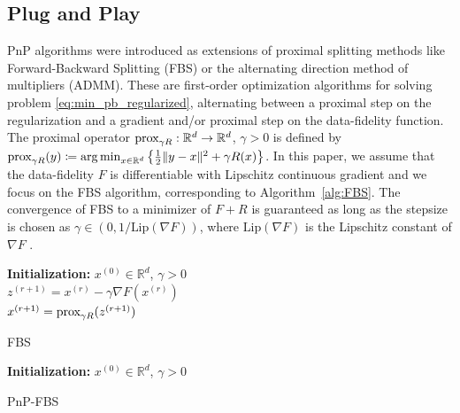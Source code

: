\documentclass{article} %
\newcommand{\prox}{\text{\normalfont prox}}
\theoremstyle{definition}
\begin{document}
\subsection{Plug and Play}
PnP algorithms were introduced as extensions of proximal splitting methods like Forward-Backward Splitting (FBS) or the alternating direction method of multipliers (ADMM). These are first-order optimization algorithms for solving problem \eqref{eq:min_pb_regularized}, alternating between a proximal step on the regularization and a gradient and/or proximal step on the data-fidelity function. 
The proximal operator $\prox_{\gamma R}: \R^d \to \R^d$, $\gamma >0$ is defined by $\prox_{\gamma R} (y) \coloneqq \argmin_{x \in \R^d} \left\{\frac12 \| y-x\|^2 + \gamma R(x) \right\}$.
In this paper, we assume that the data-fidelity $F$ is differentiable with Lipschitz continuous gradient and we focus on the FBS algorithm, corresponding to Algorithm~\ref{alg:FBS}.
The convergence of FBS to a minimizer of $F+R$ is guaranteed as long as the stepsize is chosen as $\gamma \in (0,1/\text{Lip} (\nabla F))$, where $\text{Lip} (\nabla F)$ is the Lipschitz constant of $\nabla F$ \citep{combettes2005signal}.

\begin{minipage}{0.48\textwidth}
\begin{algorithm}[H]
\textbf{Initialization:}  $x^{(0)} \in \mathbb{R}^d$, $\gamma > 0$\\
 {
$z^{(r+1)} = x^{(r)} - \gamma \nabla F(x^{(r)})$ \\
$x^{(r+1)} = \prox_{\gamma R}(z^{(r+1)}) $ \
}
\caption{FBS}
\label{alg:FBS}
\end{algorithm}
\vspace{0mm}
\end{minipage}
\hfill
\begin{minipage}{0.48\textwidth}
\begin{algorithm}[H]
 \textbf{Initialization:} $x^{(0)} \in \mathbb{R}^d$, $\gamma > 0$ \\
\caption{ PnP-FBS }
\label{alg:PNP-FBS}
\end{algorithm}
\vspace{0mm}
\end{minipage}
\end{document}
